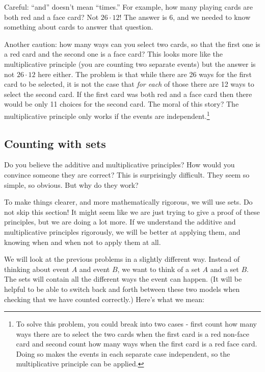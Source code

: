 \documentclass[12pt]{article}
\begin{document}
 Careful: ``and'' doesn't mean ``times.''  For example, how many playing cards are both red and a face card?  Not $26 \cdot 12$!  The answer is 6, and we needed to know something about cards to answer that question.  
 
 Another caution: how many ways can you select two cards, so that the first one is a red card and the second one is a face card?  This looks more like the multiplicative principle (you are counting two separate events) but the answer is not $26 \cdot 12$ here either.  The problem is that while there are 26 ways for the first card to be selected, it is not the case that {\em for each} of those there are 12 ways to select the second card.  If the first card was both red and a face card then there would be only 11 choices for the second card.  The moral of this story?  The multiplicative principle only works if the events are independent.\footnote{To solve this problem, you could break into two cases - first count how many ways there are to select the two cards when the first card is a red non-face card and second count how many ways when the first card is a red face card.  Doing so makes the events in each separate case independent, so the multiplicative principle can be applied.}

\subsection{Counting with sets}


Do you believe the additive and multiplicative principles?  How would you convince someone they are correct?  This is surprisingly difficult.  They seem so simple, so obvious.  But why do they work?  

To make things clearer, and more mathematically rigorous, we will use sets.  Do not skip this section!  It might seem like we are just trying to give a proof of these principles, but we are doing a lot more.  If we understand the additive and multiplicative principles rigorously, we will be better at applying them, and knowing when and when not to apply them at all.

We will look at the previous problems in a slightly different way.  Instead of thinking about event $A$ and event $B$, we want to think of a set $A$ and a set $B$.  The sets will contain all the different ways the event can happen.  (It will be helpful to be able to switch back and forth between these two models when checking that we have counted correctly.)  Here's what we mean:
\end{document}
